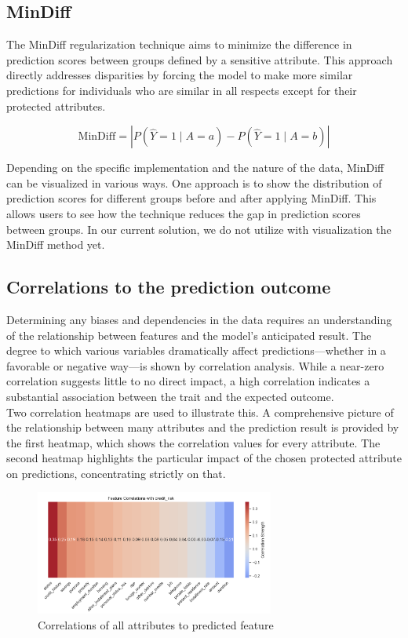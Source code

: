 \documentclass[runningheads]{llncs}
\begin{document}
\subsection{MinDiff}
The MinDiff regularization technique aims to minimize the difference in prediction scores between groups defined by a sensitive attribute. This approach directly addresses disparities by forcing the model to make more similar predictions for individuals who are similar in all respects except for their protected attributes.

\begin{equation}
\mathrm{MinDiff} = \left| P(\hat{Y} = 1 \mid A = a) - P(\hat{Y} = 1 \mid A = b) \right|
\end{equation}

Depending on the specific implementation and the nature of the data, MinDiff can be visualized in various ways. One approach is to show the distribution of prediction scores for different groups before and after applying MinDiff. This allows users to see how the technique reduces the gap in prediction scores between groups. In our current solution, we do not utilize with visualization the MinDiff method yet.

\subsection{Correlations to the prediction outcome}
Determining any biases and dependencies in the data requires an understanding of the relationship between features and the model's anticipated result. The degree to which various variables dramatically affect predictions—whether in a favorable or negative way—is shown by correlation analysis. While a near-zero correlation suggests little to no direct impact, a high correlation indicates a substantial association between the trait and the expected outcome.\\

Two correlation heatmaps are used to illustrate this. A comprehensive picture of the relationship between many attributes and the prediction result is provided by the first heatmap, which shows the correlation values for every attribute. The second heatmap highlights the particular impact of the chosen protected attribute on predictions, concentrating strictly on that.

\begin{figure}[H]
\centering
\includegraphics[width=0.7\textwidth]{images/feature-correlation.png}
\caption{Correlations of all attributes to predicted feature} \label{cfeature-correlation}
\end{figure}
\end{document}

